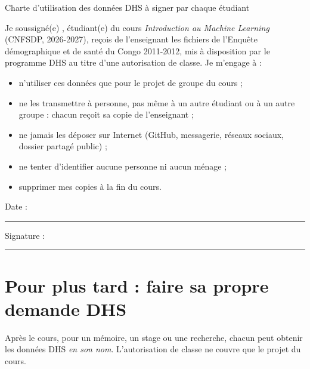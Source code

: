 \documentclass[11pt]{article}
\begin{document}
\begin{modele}{Charte d'utilisation des données DHS \textendash{} à signer par chaque étudiant}
\raggedright
Je soussigné(e) \dotfill{} , étudiant(e) du cours \emph{Introduction au Machine Learning} (CNFSDP, 2026-2027), reçois de l'enseignant les fichiers de l'Enquête démographique et de santé du Congo 2011-2012, mis à disposition par le programme DHS au titre d'une autorisation de classe. Je m'engage à :
\begin{itemize}
  \item n'utiliser ces données que pour le projet de groupe du cours ;
  \item ne les transmettre à personne, pas même à un autre étudiant ou à un autre groupe : chacun reçoit sa copie de l'enseignant ;
  \item ne jamais les déposer sur Internet (GitHub, messagerie, réseaux sociaux, dossier partagé public) ;
  \item ne tenter d'identifier aucune personne ni aucun ménage ;
  \item supprimer mes copies à la fin du cours.
\end{itemize}
\medskip
Date : \rule{3.5cm}{0.4pt} \hfill Signature : \rule{5cm}{0.4pt}
\end{modele}

\section{Pour plus tard : faire sa propre demande DHS}
\label{sec:demande}

Après le cours, pour un mémoire, un stage ou une recherche, chacun peut obtenir les données DHS \emph{en son nom}. L'autorisation de classe ne couvre que le projet du cours.
\end{document}

